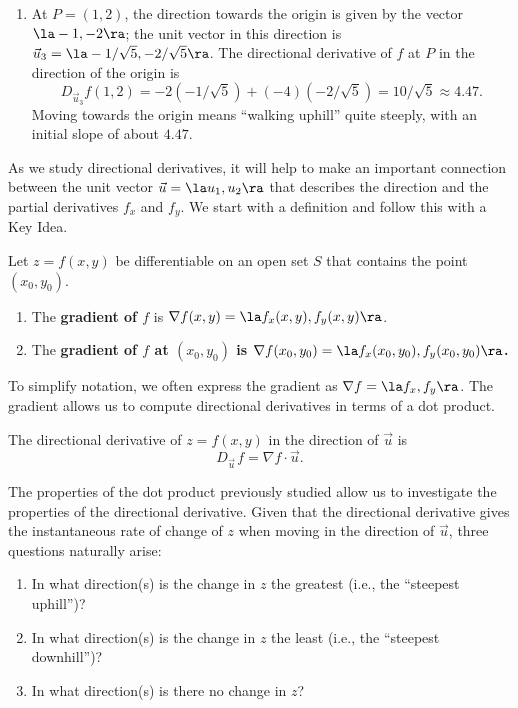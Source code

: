 {\begin{enumerate}
	Finding these directions of ``no elevation change'' is important.
	
	\item		At $P=(1,2)$, the direction towards the origin is given by the vector $\la -1,-2\ra$; the unit vector in this direction is $\vec u_3=\la -1/\sqrt{5},-2/\sqrt{5}\ra$. The directional derivative of $f$ at $P$ in the direction of the origin is
	$$D_{\vec u_3}f(1,2) = -2(-1/\sqrt{5}) + (-4)(-2/\sqrt{5}) = 10/\sqrt{5} \approx 4.47.$$
	Moving towards the origin means ``walking uphill'' quite steeply, with an initial slope of about $4.47$.\eoehere
\end{enumerate}}

As we study directional derivatives, it will help to make an important connection between the unit vector $\vec u = \la u_1,u_2\ra$ that describes the direction and the partial derivatives $f_x$ and $f_y$. We start with a definition and follow this with a Key Idea.

{Let $z=f(x,y)$ be differentiable on an open set $S$ that contains the point $(x_0,y_0)$.
\begin{enumerate}
	\item The \textbf{gradient of $f$} is $\nabla f(x,y) = \la f_x(x,y),f_y(x,y)\ra$.
	\item The \textbf{gradient of $f$ at $(x_0,y_0)$ is $\nabla f(x_0,y_0) = \la f_x(x_0,y_0),f_y(x_0,y_0)\ra$.}
\end{enumerate}
}


To simplify notation, we often express the gradient as $\nabla f = \la f_x, f_y\ra$. The gradient allows us to compute directional derivatives in terms of a dot product.

{%
The directional derivative of $z=f(x,y)$ in the direction of $\vec u$ is
$$D_{\vec u\,}f = \nabla f\cdot \vec u.$$
}

The properties of the dot product previously studied allow us to investigate the properties of the directional derivative. Given that the directional derivative gives the instantaneous rate of change of $z$ when moving in the direction of $\vec u$, three questions naturally arise:
\begin{enumerate}
	\item In what direction(s) is the change in $z$ the greatest (i.e., the ``steepest uphill'')?
	\item In what direction(s) is the change in $z$ the least (i.e.,  the ``steepest downhill'')?
	\item In what direction(s) is there no change in $z$?
\end{enumerate}

